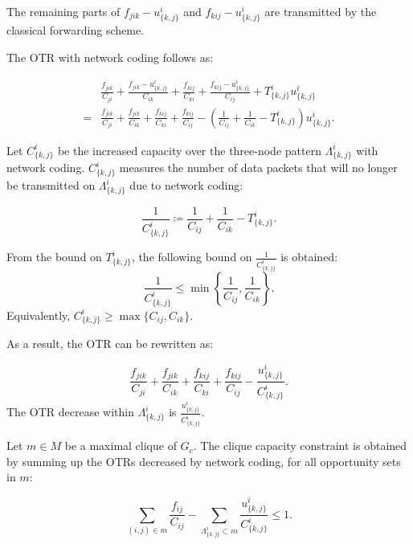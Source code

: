  The remaining parts of \(f_{jik} - u^i_{\{k,j\}}\) and \(f_{kij} - u^i_{\{k,j\}}\) are transmitted by the classical forwarding scheme.
 
  The OTR with network coding follows as:

\begin{equation}
\begin{split}
&\frac{f_{jik}}{C_{ji}}+ \frac{f_{jik}  -  u^i_{\{k,j\}}}{C_{ik}} +  \frac{f_{kij} }{C_{ki}}+ \frac{f_{kij} - u^i_{\{k,j\}}}{C_{ij}} +T^i_{\{k,j\}} u^i_{\{k,j\}} \\
=     & \frac{f_{jik}}{C_{ji}}+ \frac{f_{jik}}{C_{ik}} +  \frac{f_{kij}}{C_{ki}}+ \frac{f_{kij}}{C_{ij}}  - (\frac{1}{C_{ij}}  +\frac{1}{C_{ik}} - T^i_{\{k,j\}}) u^i_{\{k,j\}}.
\end{split}
\end{equation}

Let \(C^i_{\{k,j\}}\) be the increased capacity over the three-node pattern \(\Lambda^i_{\{k,j\}}\) with network coding. \(C^i_{\{k,j\}}\) measures the number of data packets that will no longer be transmitted on \(\Lambda^i_{\{k,j\}}\) due to network coding:

\begin{equation}
 \frac{1}{C^i_{\{k,j\}}} \coloneqq \frac{1}{C_{ij}}  +\frac{1}{C_{ik}} - T^i_{\{k,j\}}.    
\end{equation}

From the bound on \( T^i_{\{k,j\}}\), the following bound on \(\frac{1}{C^i_{\{k,j\}}}\) is obtained:
\begin{equation}
\label{capbound}
\frac{1}{C^i_{\{k,j\}}} \le \min \left \{  \frac{1}{C_{ij}},  \frac{1}{C_{ik}}  \right \}.
\end{equation}
Equivalently, \(C^i_{\{k,j\}} \ge \max \{C_{ij}, C_{ik} \}\).

As a result, the OTR can be rewritten as:

\begin{equation}
 \frac{f_{jik}}{C_{ji}}+ \frac{f_{jik}}{C_{ik}} +  \frac{f_{kij}}{C_{ki}}+ \frac{f_{kij}}{C_{ij}} - \frac{ u^i_{\{k,j\}}}{C^i_{\{k,j\}}}.
\end{equation}
The OTR decrease within \(\Lambda^i_{\{k,j\}}\) is \(\frac{ u^i_{\{k,j\}}}{C^i_{\{k,j\}}} \).

Let $m \in M$  be a maximal clique of $G_c$. The clique capacity constraint is obtained by summing up the OTRs decreased by network coding, for all opportunity sets in \(m\):

\begin{equation}
\label{setcaprev}
\sum_{(i,j) \in m} \frac{f_{ij}}{C_{ij}} - \sum_{  \Lambda^i_{\{k,j\}} \subset m} \frac{ u^i_{\{k,j\}}}{C^i_{\{k,j\}}} \le 1. \end{equation}

